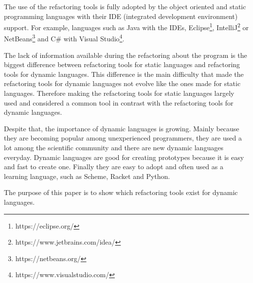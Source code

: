 The use of the refactoring tools is fully adopted by the object oriented and static programming languages with their IDE (integrated development environment) support.
For example, languages such as Java with the IDEs, Eclipse\footnote{https://eclipse.org/}, IntelliJ\footnote{https://www.jetbrains.com/idea/} or NetBeans\footnote{https://netbeans.org/} and C\# with Visual Studio\footnote{https://www.visualstudio.com/}.

The lack of information available during the refactoring about the program is the biggest difference between refactoring tools for static languages and refactoring tools for dynamic languages.
This difference is the main difficulty that made the refactoring tools for dynamic languages not evolve like the ones made for static languages. 
Therefore making the refactoring tools for static languages largely used and considered a common tool in contrast with the refactoring tools for dynamic languages.  %

Despite that, the importance of dynamic languages is growing.
Mainly because they are becoming popular among unexperienced programmers, they are used a lot among the scientific community and there are new dynamic languages everyday. 
Dynamic languages are good for creating prototypes because it is easy and fast to create one. 
Finally they are easy to adopt and often used as a learning language, such as Scheme, Racket and Python. %


The purpose of this paper is to show which refactoring tools exist for dynamic languages. %







